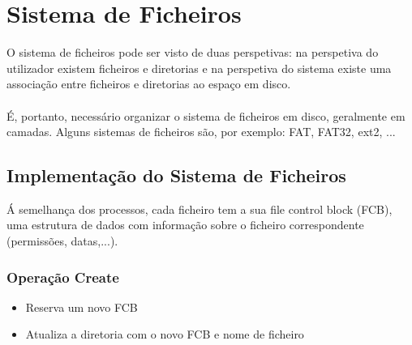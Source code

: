 \documentclass[10pt,a4paper]{report}
\begin{document}
\section{Sistema de Ficheiros}
O sistema de ficheiros pode ser visto de duas perspetivas: na perspetiva do utilizador existem ficheiros e diretorias e na perspetiva do sistema existe uma associação entre ficheiros e diretorias ao espaço em disco.\\
\\
É, portanto, necessário organizar o sistema de ficheiros em disco, geralmente em camadas. Alguns sistemas de ficheiros são, por exemplo: FAT, FAT32, ext2, ...
\subsection{Implementação do Sistema de Ficheiros}
Á semelhança dos processos, cada ficheiro tem a sua file control block (FCB), uma estrutura de dados com informação sobre o ficheiro correspondente (permissões, datas,...).
\subsubsection{Operação Create}
\begin{itemize}
\item Reserva um novo FCB
\item Atualiza a diretoria com o novo FCB e nome de ficheiro
\end{itemize}
\end{document}
